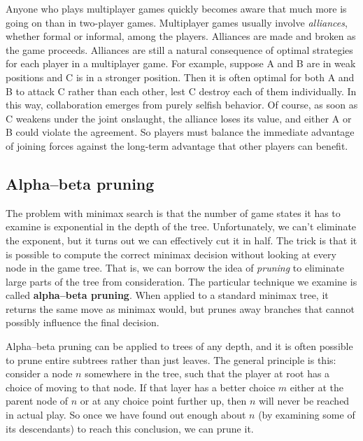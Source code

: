 Anyone who plays multiplayer games quickly becomes aware that much more is going on than in two-player games. Multiplayer games usually involve \emph{alliances}, whether formal or informal, among the players. Alliances are made and broken as the game proceeds. Alliances are still a natural consequence of optimal strategies for each player in a multiplayer game. For example, suppose A and B are in weak positions and C is in a stronger position. Then it is often optimal for both A and B to attack C rather than each other, lest C destroy each of them individually. In this way, collaboration emerges from purely selfish behavior. Of course, as soon as C weakens under the joint onslaught, the alliance loses its value, and either A or B could violate the agreement. So players must balance the immediate advantage of joining forces against the long-term advantage that other players can benefit.
\subsection{Alpha–beta pruning}
The problem with minimax search is that the number of game states it has to examine is exponential in the depth of the tree. Unfortunately, we can't eliminate the exponent, but it turns out we can effectively cut it in half. The trick is that it is possible to compute the correct minimax decision without looking at every node in the game tree. That is, we can borrow the idea of \emph{pruning} to eliminate large parts of the tree from consideration. The particular technique we examine is called \textbf{alpha–beta pruning}. When applied to a standard minimax tree, it returns the same move as minimax would, but prunes away branches that cannot possibly influence the final decision.

Alpha–beta pruning can be applied to trees of any depth, and it is often possible to prune entire subtrees rather than just leaves. The general principle is this: consider a node $n$ somewhere in the tree, such that the player at root has a choice of moving to that node. If that layer has a better choice $m$ either at the parent node of $n$ or at any choice point further up, then $n$ will never be reached in actual play. So once we have found out enough about $n$ (by examining some of its descendants) to reach this conclusion, we can prune it.

